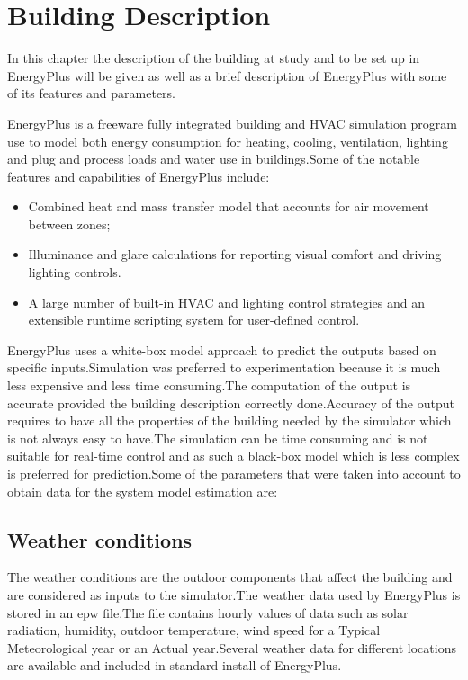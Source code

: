 \documentclass[a4paper,12pt]{report}
\numberwithin{equation}{section}
\begin{document}
\newpage
\chapter{Building Description}
In this chapter the description of the building at study and to be set up in EnergyPlus will be given as well as a brief description of EnergyPlus with some of its features and parameters.

EnergyPlus is a freeware fully integrated building and HVAC simulation program  use to model both energy consumption for heating, cooling, ventilation, lighting and plug and process loads and water use in buildings.Some of the notable features and capabilities of EnergyPlus include:
\begin{itemize}
  \item Combined heat and mass transfer model that accounts for air movement between zones;
  \item Illuminance and glare calculations for reporting visual comfort and driving lighting controls.
  \item A large number of built-in HVAC and lighting control strategies and an extensible runtime scripting system for user-defined control.
\end{itemize}

\noindent
EnergyPlus uses a white-box model approach to predict the outputs based on specific inputs.Simulation was preferred to experimentation because it is much less expensive and less time consuming.The computation of the output is accurate provided the building description correctly done.Accuracy of the output requires to have all the properties of the building needed by the simulator which is not always easy to have.The simulation can be time consuming and is not suitable for real-time control and as such a black-box model which is less complex is preferred for prediction.Some of the parameters that were taken into account to obtain data for the system model estimation are:

\section{Weather conditions}
The weather conditions are the outdoor components that affect the building and are considered as inputs to the simulator.The weather data used by EnergyPlus is stored in an epw file.The file contains hourly values of data such as solar radiation, humidity, outdoor temperature, wind speed for a Typical Meteorological year or an Actual year.Several weather data for different locations are available and included in standard install of EnergyPlus. 
\end{document}
